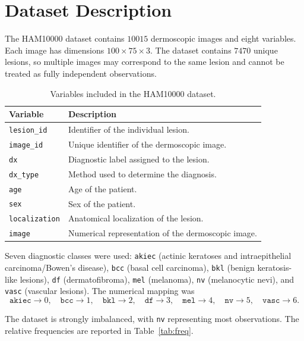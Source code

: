 \documentclass[11pt,a4paper]{article}
\begin{document}
\section{Dataset Description}
The HAM10000 dataset contains $10015$ dermoscopic images and eight variables. Each image has dimensions $100\times75\times3$. The dataset contains $7470$ unique lesions, so multiple images may correspond to the same lesion and cannot be treated as fully independent observations.

\begin{table}[H]
\centering
\small
\caption{Variables included in the HAM10000 dataset.}
\begin{tabular}{lp{9.9cm}}
\toprule
\textbf{Variable} & \textbf{Description} \\
\midrule
\texttt{lesion\_id} & Identifier of the individual lesion. \\
\texttt{image\_id} & Unique identifier of the dermoscopic image. \\
\texttt{dx} & Diagnostic label assigned to the lesion. \\
\texttt{dx\_type} & Method used to determine the diagnosis. \\
\texttt{age} & Age of the patient. \\
\texttt{sex} & Sex of the patient. \\
\texttt{localization} & Anatomical localization of the lesion. \\
\texttt{image} & Numerical representation of the dermoscopic image. \\
\bottomrule
\end{tabular}
\end{table}

Seven diagnostic classes were used: \texttt{akiec} (actinic keratoses and intraepithelial carcinoma/Bowen's disease), \texttt{bcc} (basal cell carcinoma), \texttt{bkl} (benign keratosis-like lesions), \texttt{df} (dermatofibroma), \texttt{mel} (melanoma), \texttt{nv} (melanocytic nevi), and \texttt{vasc} (vascular lesions). The numerical mapping was
\[
\texttt{akiec}\!\to\!0,\quad \texttt{bcc}\!\to\!1,\quad \texttt{bkl}\!\to\!2,\quad
\texttt{df}\!\to\!3,\quad \texttt{mel}\!\to\!4,\quad \texttt{nv}\!\to\!5,\quad \texttt{vasc}\!\to\!6.
\]

The dataset is strongly imbalanced, with \texttt{nv} representing most observations. The relative frequencies are reported in Table~\ref{tab:freq}.
\end{document}

